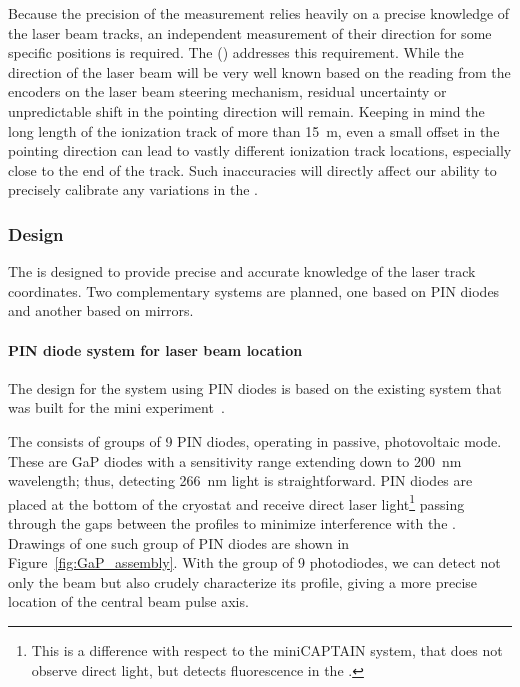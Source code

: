 \label{sec:calib-laser-pos}
Because the precision of the \efield measurement relies heavily on a precise knowledge of the laser beam tracks, an independent measurement of their direction for some specific positions is required. The %
 ()
addresses this requirement. While the direction of the laser beam will be very well known based on the reading from the encoders on the laser beam steering mechanism,  residual uncertainty or unpredictable shift in the pointing direction will remain. 
Keeping in mind the long length of the ionization track of more than \SI{15}{\m}, even a small offset in the pointing direction can lead to vastly different ionization track locations, especially close to the end of the track. Such inaccuracies will directly affect our ability to precisely calibrate any variations in the \efield.

\subsubsection{Design}
The  is designed to provide precise and accurate knowledge of the laser track coordinates.  
Two complementary systems are planned, one based on PIN diodes and another based on mirrors.

\paragraph{PIN diode system for laser beam location}

The design for the system using PIN diodes is based on the existing system that was built for the mini experiment~\cite{Berns:2013usa}.


The  consists of groups of \num{9} PIN diodes, operating in passive, photovoltaic mode. These are GaP diodes with a sensitivity range extending down to  \SI{200}{\nano\m} wavelength; thus, detecting \SI{266}{\nano\m} light is straightforward. %
PIN diodes are placed at the bottom of the cryostat and receive direct laser light\footnote{This is a difference with respect to the miniCAPTAIN system, that does not observe direct light, but detects fluorescence in the \frfour.} passing through the gaps between the  profiles to minimize interference with the . Drawings of one such group of PIN diodes are shown in Figure~\ref{fig:GaP_assembly}. With the group of \num{9} photodiodes, we can detect not only the beam but also crudely characterize its profile, giving a more precise location of the central beam pulse axis. 


